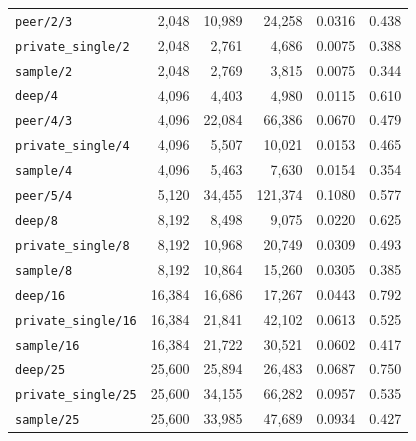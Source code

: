 \begin{tabular}{lrrrrr}
\texttt{peer/2/3} & 2,048 & 10,989 & 24,258 & 0.0316 & 0.438 \\
\texttt{private\_single/2} & 2,048 & 2,761 & 4,686 & 0.0075 & 0.388 \\
\texttt{sample/2} & 2,048 & 2,769 & 3,815 & 0.0075 & 0.344 \\
\texttt{deep/4} & 4,096 & 4,403 & 4,980 & 0.0115 & 0.610 \\
\texttt{peer/4/3} & 4,096 & 22,084 & 66,386 & 0.0670 & 0.479 \\
\texttt{private\_single/4} & 4,096 & 5,507 & 10,021 & 0.0153 & 0.465 \\
\texttt{sample/4} & 4,096 & 5,463 & 7,630 & 0.0154 & 0.354 \\
\texttt{peer/5/4} & 5,120 & 34,455 & 121,374 & 0.1080 & 0.577 \\
\texttt{deep/8} & 8,192 & 8,498 & 9,075 & 0.0220 & 0.625 \\
\texttt{private\_single/8} & 8,192 & 10,968 & 20,749 & 0.0309 & 0.493 \\
\texttt{sample/8} & 8,192 & 10,864 & 15,260 & 0.0305 & 0.385 \\
\texttt{deep/16} & 16,384 & 16,686 & 17,267 & 0.0443 & 0.792 \\
\texttt{private\_single/16} & 16,384 & 21,841 & 42,102 & 0.0613 & 0.525 \\
\texttt{sample/16} & 16,384 & 21,722 & 30,521 & 0.0602 & 0.417 \\
\texttt{deep/25} & 25,600 & 25,894 & 26,483 & 0.0687 & 0.750 \\
\texttt{private\_single/25} & 25,600 & 34,155 & 66,282 & 0.0957 & 0.535 \\
\texttt{sample/25} & 25,600 & 33,985 & 47,689 & 0.0934 & 0.427 \\
\bottomrule
\end{tabular}
